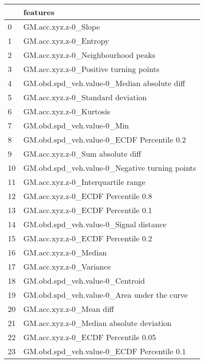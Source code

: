 \begin{tabular}{ll}
\toprule
{} &                                        features \\
\midrule
0  &                            GM.acc.xyz.z-0\_Slope \\
1  &                          GM.acc.xyz.z-0\_Entropy \\
2  &              GM.acc.xyz.z-0\_Neighbourhood peaks \\
3  &          GM.acc.xyz.z-0\_Positive turning points \\
4  &     GM.obd.spd\_veh.value-0\_Median absolute diff \\
5  &               GM.acc.xyz.z-0\_Standard deviation \\
6  &                         GM.acc.xyz.z-0\_Kurtosis \\
7  &                      GM.obd.spd\_veh.value-0\_Min \\
8  &      GM.obd.spd\_veh.value-0\_ECDF Percentile 0.2 \\
9  &                GM.acc.xyz.z-0\_Sum absolute diff \\
10 &  GM.obd.spd\_veh.value-0\_Negative turning points \\
11 &              GM.acc.xyz.z-0\_Interquartile range \\
12 &              GM.acc.xyz.z-0\_ECDF Percentile 0.8 \\
13 &              GM.acc.xyz.z-0\_ECDF Percentile 0.1 \\
14 &          GM.obd.spd\_veh.value-0\_Signal distance \\
15 &              GM.acc.xyz.z-0\_ECDF Percentile 0.2 \\
16 &                           GM.acc.xyz.z-0\_Median \\
17 &                         GM.acc.xyz.z-0\_Variance \\
18 &                 GM.obd.spd\_veh.value-0\_Centroid \\
19 &     GM.obd.spd\_veh.value-0\_Area under the curve \\
20 &                        GM.acc.xyz.z-0\_Mean diff \\
21 &        GM.acc.xyz.z-0\_Median absolute deviation \\
22 &             GM.acc.xyz.z-0\_ECDF Percentile 0.05 \\
23 &      GM.obd.spd\_veh.value-0\_ECDF Percentile 0.1 \\
\bottomrule
\end{tabular}

